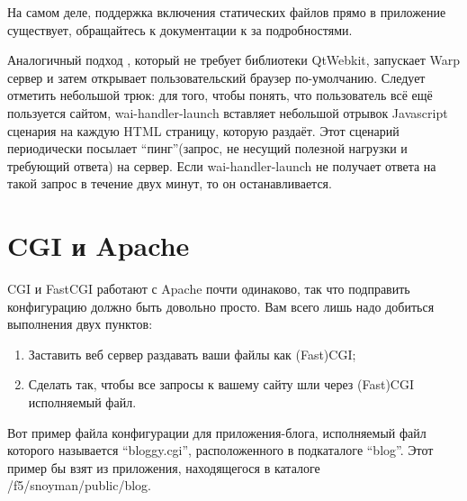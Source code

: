 На самом деле, поддержка включения статических файлов прямо в приложение существует, обращайтесь к документации к  за подробностями.
%

Аналогичный подход , который не требует библиотеки QtWebkit, запускает Warp сервер и затем открывает пользовательский браузер по-умолчанию. Следует отметить небольшой трюк: для того, чтобы понять, что пользователь всё ещё пользуется сайтом, wai-handler-launch вставляет небольшой отрывок Javascript сценария на каждую HTML страницу, которую раздаёт. Этот сценарий периодически посылает ``пинг''(запрос, не несущий полезной нагрузки и требующий ответа) на сервер. Если wai-handler-launch не получает ответа на такой запрос в течение двух минут, то он останавливается.
%

\section{CGI и Apache}
%
%

CGI и FastCGI работают с Apache почти одинаково, так что подправить конфигурацию должно быть довольно просто. Вам всего лишь надо добиться выполнения двух пунктов:
\begin{enumerate}
  \item Заставить веб сервер раздавать ваши файлы как (Fast)CGI;
  \item Сделать так, чтобы все запросы к вашему сайту шли через (Fast)CGI исполняемый файл.
\end{enumerate}

%
Вот пример файла конфигурации для приложения-блога, исполняемый файл которого называется ``bloggy.cgi'', расположенного в подкаталоге ``blog''. Этот пример бы взят из приложения, находящегося в каталоге /f5/snoyman/public/blog.

